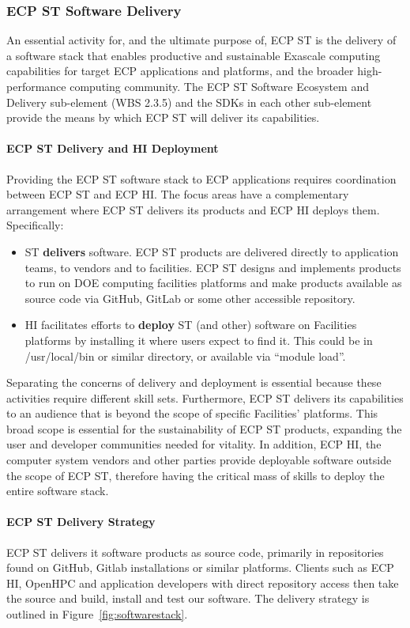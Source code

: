 \subsubsection{ECP ST Software Delivery}
An essential activity for, and the ultimate purpose of, ECP ST is the delivery of a software stack that enables productive and sustainable Exascale computing capabilities for target ECP applications and platforms, and the broader high-performance computing community. The ECP ST Software Ecosystem and Delivery sub-element (WBS 2.3.5) and the SDKs in each other sub-element provide the means by which ECP ST will deliver its capabilities.
\paragraph{ECP ST Delivery and HI Deployment}
Providing the ECP ST software stack to ECP applications requires coordination between ECP ST and ECP HI. The focus areas have a complementary arrangement where ECP ST delivers its products and ECP HI deploys them. Specifically:
\begin{itemize}
	\item ST \textbf{delivers} software.  ECP ST products are delivered directly to application teams, to vendors and to facilities.  ECP ST designs and implements products to run on DOE computing facilities platforms and make products available as source code via GitHub, GitLab or some other accessible repository.
	\item HI facilitates efforts to \textbf{deploy} ST (and other) software on Facilities platforms by installing it where users expect to find it. This could be in /usr/local/bin or similar directory, or available via “module load”.
\end{itemize}
Separating the concerns of delivery and deployment is essential because these activities require different skill sets. Furthermore, ECP ST delivers its capabilities to an audience that is beyond the scope of specific Facilities’ platforms. This broad scope is essential for the sustainability of ECP ST products, expanding the user and developer communities needed for vitality. In addition, ECP HI, the computer system vendors and other parties provide deployable software outside the scope of ECP ST, therefore having the critical mass of skills to deploy the entire software stack.

\paragraph{ECP ST Delivery Strategy}
ECP ST delivers it software products as source code, primarily in repositories found on GitHub, Gitlab installations or similar platforms. Clients such as ECP HI, OpenHPC and application developers with direct repository access then take the source and build, install and test our software. The delivery strategy is outlined in Figure~\ref{fig:softwarestack}.  

